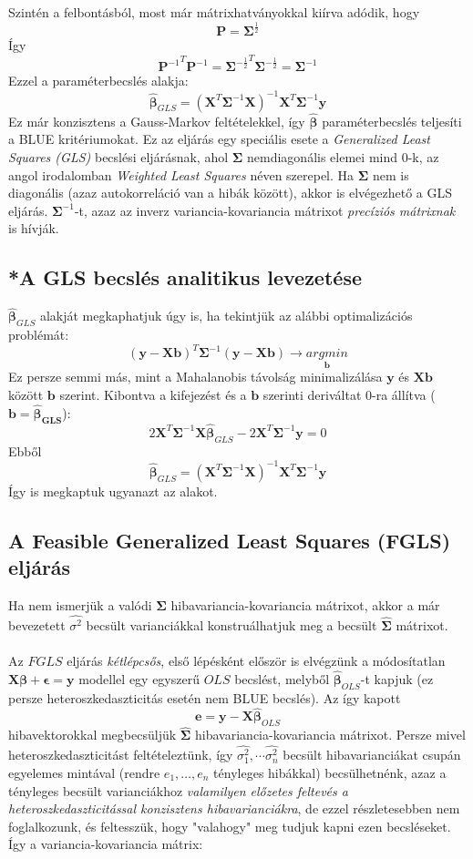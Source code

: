 \documentclass[14p]{report}
\def\pmb{\boldsymbol}
\def\ebeta{\hat{\pmb{\beta}}}
\def\e{\epsilon}
\begin{document}
	Szintén a felbontásból, most már mátrixhatványokkal kiírva adódik, hogy
	\[
		\pmb{P} = \pmb{\Sigma}^{\frac{1}{2}}
	\]
	Így
	\[
		{\pmb{P}^{-1}}^T\pmb{P}^{-1} = {\pmb{\Sigma}^{-\frac{1}{2}}}^T\pmb{\Sigma}^{-\frac{1}{2}} = \pmb{\Sigma}^{-1}
	\]
	Ezzel a paraméterbecslés alakja:
	\[
		\ebeta_{GLS} = (\pmb{X}^T\pmb{\Sigma}^{-1}\pmb{X})^{-1}\pmb{X}^T\pmb{\Sigma}^{-1}\pmb{y}
	\]
	Ez már konzisztens a Gauss-Markov feltételekkel, így $\ebeta$ paraméterbecslés teljesíti a BLUE kritériumokat. Ez az eljárás egy speciális esete a \emph{Generalized Least Squares (GLS)} becslési eljárásnak, ahol $\pmb{\Sigma}$ nemdiagonális elemei mind $0$-k, az angol irodalomban \emph{Weighted Least Squares} néven szerepel. Ha $\pmb{\Sigma}$ nem is diagonális (azaz autokorreláció van a hibák között), akkor is elvégezhető a GLS eljárás. $\pmb{\Sigma}^{-1}$-t, azaz az inverz variancia-kovariancia mátrixot \emph{precíziós mátrixnak} is hívják.
	\subsection{*A GLS becslés analitikus levezetése}
	$\ebeta_{GLS}$ alakját megkaphatjuk úgy is, ha tekintjük az alábbi optimalizációs problémát:
	\[
		(\pmb{y} - \pmb{X}\pmb{b})^T\pmb{\Sigma}^{-1}(\pmb{y} - \pmb{X}\pmb{b}) \rightarrow \underset{\pmb{b}}{argmin}
	\]
	Ez persze semmi más, mint a Mahalanobis távolság minimalizálása $\pmb{y}$ és $\pmb{X}\pmb{b}$ között $\pmb{b}$ szerint. Kibontva a kifejezést és a $\pmb{b}$ szerinti deriváltat $0$-ra állítva ($\pmb{b} = \pmb{\ebeta_{GLS}}$):
	\[
		2\pmb{X}^T\pmb{\Sigma}^{-1}\pmb{X}\ebeta_{GLS} - 2\pmb{X}^T\pmb{\Sigma}^{-1}\pmb{y} = 0
	\]
	Ebből
	\[
		\ebeta_{GLS} = (\pmb{X}^T\pmb{\Sigma}^{-1}\pmb{X})^{-1}\pmb{X}^T\pmb{\Sigma}^{-1}\pmb{y}
	\]
	Így is megkaptuk ugyanazt az alakot.
	\subsection{A Feasible Generalized Least Squares (FGLS) eljárás}
	Ha nem ismerjük a valódi $\pmb{\Sigma}$ hibavariancia-kovariancia mátrixot, akkor a már bevezetett $\widehat{\sigma^2}$ becsült varianciákkal konstruálhatjuk meg a becsült $\widehat{\pmb{\Sigma}}$ mátrixot.
	\\
	\\
	Az $FGLS$ eljárás \emph{kétlépcsős}, első lépésként először is elvégzünk a módosítatlan $\pmb{X}\pmb{\beta} + \pmb{\e} = \pmb{y}$ modellel egy egyszerű $OLS$ becslést, melyből $\ebeta_{OLS}$-t kapjuk (ez persze heteroszkedaszticitás esetén nem BLUE becslés). Az így kapott
	\[
		\pmb{e} = \pmb{y} - \pmb{X}\ebeta_{OLS}
	\]
	hibavektorokkal megbecsüljük $\widehat{\pmb{\Sigma}}$ hibavariancia-kovariancia mátrixot. Persze mivel heteroszkedaszticitást feltételeztünk, így $\widehat{\sigma_1^2}, \dotsm \widehat{\sigma_n^2}$ becsült hibavarianciákat csupán egyelemes mintával (rendre $e_1, \dots, e_n$ tényleges hibákkal) becsülhetnénk, azaz a tényleges becsült varianciákhoz \emph{valamilyen előzetes feltevés a heteroszkedaszticitással konzisztens hibavarianciákra}, de ezzel részletesebben nem foglalkozunk, és feltesszük, hogy "valahogy" meg tudjuk kapni ezen becsléseket. Így a variancia-kovariancia mátrix:  
\end{document}
